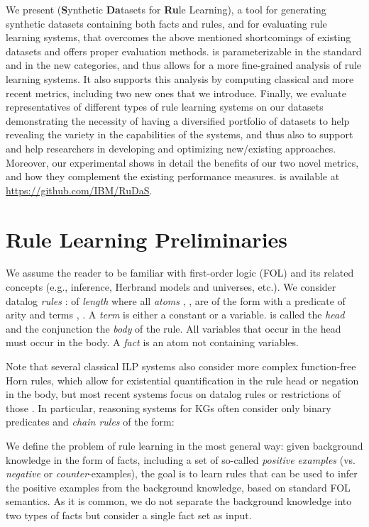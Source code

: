 \documentclass[letterpaper]{article} \usepackage{aaai20}  \usepackage{times}  \usepackage{helvet} \usepackage{courier}  \usepackage[hyphens]{url}  \usepackage{graphicx} \urlstyle{rm} \def\UrlFont{\rm}  \usepackage{graphicx}  \frenchspacing  \setlength{\pdfpagewidth}{8.5in}  \setlength{\pdfpageheight}{11in}  \usepackage{amsthm}
\theoremstyle{definition}
\newcommand{\tool}{\text{RuDaS}\xspace}
\begin{document}
We present \tool (\textbf{S}ynthetic \textbf{Da}tasets for \textbf{Ru}le Learning), a tool for generating synthetic datasets containing both facts and rules, and for evaluating rule learning systems, that overcomes the above mentioned shortcomings of existing datasets and offers proper evaluation methods. 
\tool is parameterizable in the standard and in the new categories, and thus allows for a more fine-grained analysis of rule learning systems. It also supports this analysis by computing classical and more recent metrics, including two new ones that we introduce.
Finally, we evaluate representatives of different types of rule learning systems on our datasets demonstrating the necessity of having a diversified portfolio of datasets to help revealing the variety in the capabilities of the systems, and thus also to support and help researchers in developing and optimizing new/existing approaches.
Moreover, our experimental shows in detail the benefits of our two novel metrics, and how they complement the existing performance measures.
\tool is available at 
\url{https://github.com/IBM/RuDaS}.

\section{Rule Learning Preliminaries}\label{sec:motivation}

We assume the reader to be familiar with first-order logic (FOL) and its related concepts (e.g., inference, Herbrand models and universes, etc.).
We consider datalog \emph{rules} \cite{datalog}: 
of \emph{length}  where all \emph{atoms} , , are of the form  with a {predicate}  of arity  and terms , .
A \emph{term} is either a constant or a variable. 
 is called the \emph{head} and the conjunction  the \emph{body} of the rule. All variables that occur in the head must occur in the body. A \emph{fact} is an atom not containing variables.


Note that several classical ILP systems also consider more complex function-free Horn rules, which allow for existential quantification in the rule head or negation in the body, but most recent systems focus on datalog rules or restrictions of those \cite{Galarraga+-VLDBJ15:amiep,EGre-jair18:learning-explanatory-rules,RoR-NIPS17}. In particular, reasoning systems for KGs \cite{YaYaCo-NIPS17:neurallp,OWaWa-IJCAI18:scalable-rule-learning}
often consider only binary predicates and \emph{chain rules} of the form:

We define the problem of rule learning in the most general way:
given 
background knowledge in the form of facts, including a set of so-called \emph{positive examples} (vs. \emph{negative} or \emph{counter}-examples), the goal is to learn rules that can be used to infer the positive examples from the background knowledge, based on standard FOL semantics.
As it is common, we do not separate the background knowledge into two types of facts but consider a single fact set as input.
\end{document}
